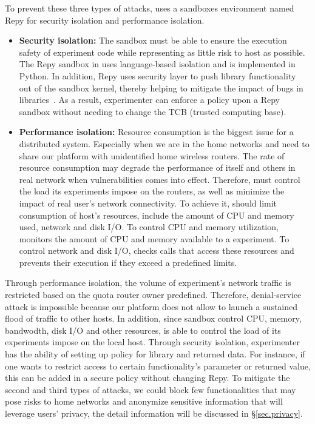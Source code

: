 To prevent these three types of attacks, \sysname uses a sandboxes environment named Repy for security isolation and performance isolation. 
\begin{itemize} 
\item \textbf{Security isolation:} The sandbox must be able to ensure the execution safety of experiment code while representing as little risk to host as possible. The Repy sandbox in \sysname uses language-based isolation and is implemented in Python. In addition, Repy uses security layer to push library functionality out of the sandbox kernel, thereby helping to mitigate the impact of bugs in libraries~\cite{cappos2010retaining}. As a result, experimenter can enforce a policy upon a Repy sandbox without needing to change the TCB (trusted computing base).  
\item \textbf{Performance isolation:} Resource consumption is the biggest issue for a distributed system. Especially when we are in the home networks and need to share our platform with unidentified home wireless routers. The rate of resource consumption may degrade the performance of itself and others in real network when vulnerabilities comes into effect\cite{joshi2013survey}. Therefore, \sysname must control the load its experiments impose on the routers, as well as minimize the impact of real user's network connectivity. To achieve it, \sysname should limit consumption of host's resources, include the amount of CPU and memory used, network and disk I/O. To control CPU and memory utilization, \sysname monitors the amount of CPU and memory available to a experiment. To control network and disk I/O, \sysname checks calls that access these resources and prevents their execution if they exceed a predefined limits. 
\end{itemize}

Through performance isolation, the volume of experiment's network traffic is restricted based on the quota router owner predefined. Therefore, denial-service attack is impossible because our platform does not allow to launch a sustained flood of traffic to other hosts. In addition, since sandbox control CPU, memory, bandwodth, disk I/O and other resources, \sysname is able to control the load of its experiments impose on the local host. Through security isolation, experimenter has the ability of setting up policy for library and returned data. For instance, if one wants to restrict access to certain functionality's parameter or returned value, this can be added in a secure policy without changing Repy. To mitigate the second and third types of attacks, we could block few functionalities that may pose risks to home networks and anonymize sensitive information that will leverage users' privacy, the detail information will be discussed in \S{\ref{sec.privacy}}. 

